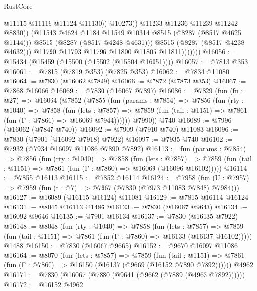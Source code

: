 \begin{lexlean}{RustCore}
\begin{coremodule}
                                  @11115
                                  @11119
                                  @11124
                                  @11130))
                              @10273))
                          @11233
                          @11236
                          @11239
                          @11242
                          @8830))
                      (@11543 @4624 @1184 @11549 @10314 @8515 (@8287 (@8517 @4625 @1144)))
                      @8515
                      (@8287 (@8517 @4248 @4631)))
                    @8515
                    (@8287 (@8517 @4238 @4632)))
                  @11790
                  @11793
                  @11796
                  @11800
                  @11805
                  @11811)))))))
@16056 := @15434 (@15459 (@15500 (@15502 (@15504 @16051))))
@16057 := @7813 @353
@16061 := @7815 (@7819 @353) (@7825 @353)
@16062 := @7834 @11080
@16064 := @7830 (@16062 @7849)
@16066 := @7872 (@7873 @353)
@16067 := @7868 @16066
@16069 := @7830 (@16067 @7897)
@16086 := @7829
    (fun (fn : @27) =>
    @16064
      (@7852
        (@7855
          (fun (params : @7854) =>
          @7856
            (fun (rty : @1040) =>
            @7858
              (fun (lets : @7857) =>
              @7859 (fun (tail : @1151) => @7861 (fun (Γ : @7860) => @16069 @7944))))))
        @7990))
    @740
@16089 := @7996 (@16062 (@7847 @740))
@16092 := @7909 (@7910 @740) @11083
@16096 := @7830 (@7901 (@16092 @7918) @7922)
@16097 := @7935 @740
@16102 := @7932 (@7934 @16097 @11086 @7890 @7892)
@16113 := fun (params : @7854) =>
  @7856
    (fun (rty : @1040) =>
    @7858
      (fun (lets : @7857) =>
      @7859 (fun (tail : @1151) => @7861 (fun (Γ : @7860) => @16069 (@16096 @16102)))))
@16114 := @7855 @16113
@16115 := @7852 @16114
@16124 := @7958
    (fun (U : @7957) => @7959 (fun (t : @7) => @7967 (@7830 (@7973 @11083 @7848) @7984)))
@16127 := @16089 (@16115 @16124) @11081
@16129 := @7815 @16114 @16124
@16131 := @8045 @16113 @1486
@16133 := @7830 (@16067 @9643)
@16134 := @16092 @9646
@16135 := @7901 @16134
@16137 := @7830 (@16135 @7922)
@16148 := @8048
    (fun (rty : @1040) =>
    @7858
      (fun (lets : @7857) =>
      @7859 (fun (tail : @1151) => @7861 (fun (Γ : @7860) => @16133 (@16137 @16102)))))
    @1488
@16150 := @7830 (@16067 @9665)
@16152 := @9670 @16097 @11086
@16164 := @8070
    (fun (lets : @7857) =>
    @7859
      (fun (tail : @1151) =>
      @7861 (fun (Γ : @7860) => @16150 (@16137 (@9669 (@16152 @7890 @7892))))))
    @4962
@16171 := @7830 (@16067 (@7880 (@9641 (@9662 (@7889 (@4963 @7892))))))
@16172 := @16152 @4962

\end{coremodule}
\end{lexlean}
